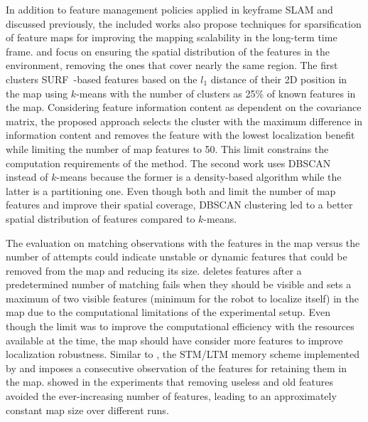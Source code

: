 In addition to feature management policies applied in keyframe SLAM and discussed previously, the included works also propose techniques for sparsification of feature maps for improving the mapping scalability in the long-term time frame.
\cite{hochdorfer-schlegel:2009} and \cite{hochdorfer-et-al:2009:5339626} focus on ensuring the spatial distribution of the features in the environment, removing the ones that cover nearly the same region.
The first clusters SURF~\parencite{original:surf}-based features based on the $l_1$ distance of their 2D position in the map using $k$-means with the number of clusters as 25\% of known features in the map. Considering feature information content as dependent on the covariance matrix, the proposed approach selects the cluster with the maximum difference in information content and removes the feature with the lowest localization benefit while limiting the number of map features to 50. This limit constrains the computation requirements of the method. The second work uses DBSCAN~\parencite{original:dbscan} instead of $k$-means because the former is a density-based algorithm while the latter is a partitioning one. Even though both \cite{hochdorfer-schlegel:2009} and \cite{hochdorfer-et-al:2009:5339626} limit the number of map features and improve their spatial coverage, DBSCAN clustering led to a better spatial distribution of features compared to $k$-means.

The evaluation on matching observations with the features in the map versus the number of attempts could indicate unstable or dynamic features that could be removed from the map and reducing its size.
\cite{davison-murray:2002:1017615} deletes features after a predetermined number of matching fails when they should be visible and sets a maximum of two visible features (minimum for the robot to localize itself) in the map due to the computational limitations of the experimental setup. Even though the limit was to improve the computational efficiency with the resources available at the time, the map should have consider more features to improve localization robustness.
Similar to \cite{davison-murray:2002:1017615}, the STM/LTM memory scheme implemented by \cite{dayoub-et-al:2011:013} and \cite{bacca-et-al:2013:003} imposes a consecutive observation of the features for retaining them in the map. \cite{bacca-et-al:2013:003} showed in the experiments that removing useless and old features avoided the ever-increasing number of features, leading to an approximately constant map size over different runs.

